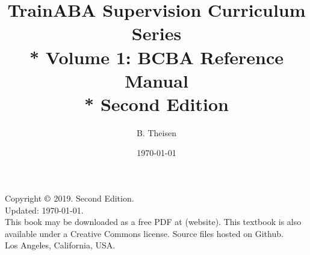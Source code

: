 \documentclass[14pt]{book}
\title{TrainABA Supervision Curriculum Series\\* Volume 1: BCBA Reference Manual \\* Second Edition}
\author{B. Theisen}
\date{\today}
\begin{document}
	\maketitle
	\null \vfill
	\noindent%
		Copyright $\copyright$ 2019. Second Edition. \\
		Updated: \today. \\
	\noindent%
		This book may be downloaded as a free PDF at (website).
		This textbook is also available under a Creative Commons license.
		Source files hosted on {Github}. \\

	\noindent Los Angeles, California, USA.
	\newpage
	\tableofcontents
	\listoffigures
	\listoftables
	
	
	
	\nocite{*}	
	
	\printbibliography   
	\printindex
\end{document}
